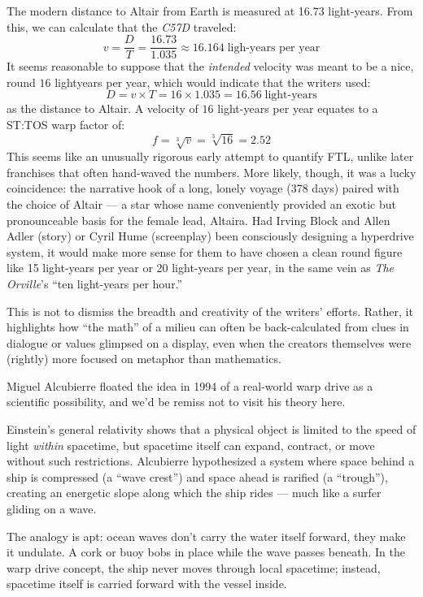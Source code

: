 \documentclass[
  letterpaper,
]{book}
\begin{document}
The modern distance to Altair from Earth is measured at 16.73
light-years. From this, we can calculate that the \emph{C57D} traveled:
\[
v = \frac{D}{T} = \frac{16.73}{1.035} ≈ 16.164\;\text{ligh-years per year} 
\] It seems reasonable to suppose that the \emph{intended} velocity was
meant to be a nice, round \(16\) lightyears per year, which would
indicate that the writers used: \[
D = v \times T = 16 \times 1.035 = 16.56\;\text{light-years}
\] as the distance to Altair. A velocity of \(16\) light-years per year
equates to a ST:TOS warp factor of: \[
f = \sqrt[3]{v} = \sqrt[3]{16} = 2.52
\] This seems like an unusually rigorous early attempt to quantify FTL,
unlike later franchises that often hand-waved the numbers. More likely,
though, it was a lucky coincidence: the narrative hook of a long, lonely
voyage (378 days) paired with the choice of Altair --- a star whose name
conveniently provided an exotic but pronounceable basis for the female
lead, Altaira. Had Irving Block and Allen Adler (story) or Cyril Hume
(screenplay) been consciously designing a hyperdrive system, it would
make more sense for them to have chosen a clean round figure like 15
light-years per year or 20 light-years per year, in the same vein as
\emph{The Orville}'s ``ten light-years per hour.''

This is not to dismiss the breadth and creativity of the writers'
efforts. Rather, it highlights how ``the math'' of a milieu can often be
back-calculated from clues in dialogue or values glimpsed on a display,
even when the creators themselves were (rightly) more focused on
metaphor than mathematics.

Miguel Alcubierre floated the idea in 1994 of a real-world warp drive as
a scientific possibility, and we'd be remiss not to visit his theory
here.

Einstein's general relativity shows that a physical object is limited to
the speed of light \emph{within} spacetime, but spacetime itself can
expand, contract, or move without such restrictions. Alcubierre
hypothesized a system where space behind a ship is compressed (a ``wave
crest'') and space ahead is rarified (a ``trough''), creating an
energetic slope along which the ship rides --- much like a surfer
gliding on a wave.

The analogy is apt: ocean waves don't carry the water itself forward,
they make it undulate. A cork or buoy bobs in place while the wave
passes beneath. In the warp drive concept, the ship never moves through
local spacetime; instead, spacetime itself is carried forward with the
vessel inside.
\end{document}

